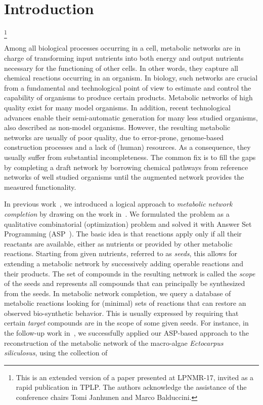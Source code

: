 
\section{Introduction}\label{sec:introduction}
\newcommand\blfootnote[1]{%
  \begingroup
  \renewcommand\thefootnote{}\footnote{#1}%
  \addtocounter{footnote}{-1}%
  \endgroup
}
\blfootnote{This is an extended version of a paper presented at LPNMR-17, invited as a rapid publication in TPLP. The authors acknowledge the assistance of the conference chairs Tomi Janhunen and Marco Balduccini.}
Among all biological processes occurring in a cell, metabolic networks are in charge of transforming
input nutrients into both energy and output nutrients necessary for the functioning of other cells.
In other words, they capture all chemical reactions occurring in an organism.
In biology,
such networks are crucial from a fundamental and technological point of view
to estimate and control the capability of organisms to produce certain products.
%
Metabolic networks of high quality exist for many model organisms.
In addition,
recent technological advances enable their semi-automatic generation for many less studied organisms, also described as non-model organisms.
However,
the resulting metabolic networks are usually of poor quality,
due to error-prone, genome-based construction processes and a lack of (human) resources.
As a consequence, they usually suffer from substantial incompleteness.
The common fix is to fill the gaps by completing a draft network by borrowing chemical pathways
from reference networks of well studied organisms until the augmented network provides the measured functionality.

In previous work~\citep{schthi09a}, we introduced a logical approach to \emph{metabolic network completion}
by drawing on the work in~\citep{haebhe05a}. %
We formulated the problem as a qualitative combinatorial (optimization) problem and solved it with Answer Set Programming (ASP~\citep{baral02a}).
%
The basic idea is that reactions apply only if all their reactants are available,
either as nutrients or provided by other metabolic reactions.
Starting from given nutrients, referred to as \emph{seeds},
this allows for extending a metabolic network by successively adding operable
reactions and their products.
The set of compounds in the resulting network is called the \emph{scope} of the
seeds and represents all compounds that can principally be synthesized from the seeds.
In metabolic network completion, we query a database of metabolic reactions
looking for (minimal) sets of reactions that can restore an observed bio-synthetic behavior.
This is usually expressed by requiring that certain \emph{target} compounds are in the scope of some given seeds.
%
For instance, in the follow-up work in~\citep{coevgeprscsith13a,prcodideetdaevthcabosito14a},
we successfully applied our ASP-based approach to the reconstruction of the metabolic network of the macro-algae \emph{Ectocarpus siliculosus},
using the collection of 

